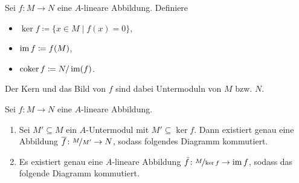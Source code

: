 \documentclass[12pt,a4paper]{scrartcl}
\theoremstyle{cplain}
\theoremstyle{cdef}
\begin{document}
\begin{defi}
	Sei $f\colon M\to N$ eine $A$-lineare Abbildung. Definiere
	\begin{itemize}
		\item $\ker f \coloneqq \{x\in M\mid f(x) = 0\}$,
		\item $\operatorname{im} f \coloneqq f(M)$,
		\item $\operatorname{coker} f\coloneqq N/\operatorname{im} (f)$.
	\end{itemize}
	Der Kern und das Bild von $f$ sind dabei Untermoduln von $M$ bzw. $N$.
\end{defi}
\begin{lem}
	Sei $f\colon M\to N$ eine $A$-lineare Abbildung.
	\begin{enumerate}
        \item Sei $M'\subseteq M$ ein $A$-Untermodul mit $M'\subseteq \ker f$. Dann existiert genau eine Abbildung $\overline{f}\colon \nicefrac{M}{M'}\to N$, sodass folgendes Diagramm kommutiert.
        \begin{figure}[H]
            \centering
        \end{figure} \label{lem:homosatz fuer moduln:i}
        \item Es existiert genau eine $A$-lineare Abbildung $\tilde{f}\colon \nicefrac{M}{\operatorname{ker} f}\to \operatorname{im} f$, sodass das folgende Diagramm kommutiert.
        \begin{figure}[H]
            \centering
        \end{figure}
	\end{enumerate}
\end{lem}
\end{document}
